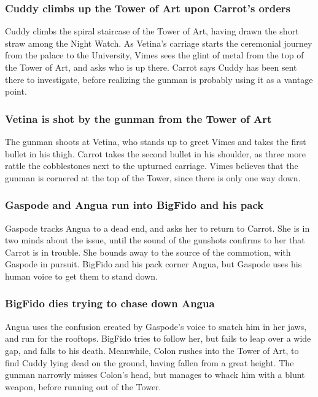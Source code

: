\subsubsection{\Gls{Cuddy} climbs up the Tower of Art upon \Gls{Carrot}'s orders}
\Gls{Cuddy} climbs the spiral staircase of the Tower of Art, having drawn the short straw among the
Night Watch. As \Gls{Vetina}'s carriage starts the ceremonial journey from the palace to the
University, \Gls{Vimes} sees the glint of metal from the top of the Tower of Art, and asks who is
up there. \Gls{Carrot} says \Gls{Cuddy} has been sent there to investigate, before realizing the
gunman is probably using it as a vantage point.

\subsubsection{\Gls{Vetina} is shot by the gunman from the Tower of Art}
The gunman shoots at \Gls{Vetina}, who stands up to greet \Gls{Vimes} and takes the first bullet in
his thigh. \Gls{Carrot} takes the second bullet in his shoulder, as three more rattle the
cobblestones next to the upturned carriage. \Gls{Vimes} believes that the gunman is cornered at the
top of the Tower, since there is only one way down.

\subsubsection{\Gls{Gaspode} and \Gls{Angua} run into \Gls{BigFido} and his pack}
\Gls{Gaspode} tracks \Gls{Angua} to a dead end, and asks her to return to \Gls{Carrot}. She is in
two minds about the issue, until the sound of the gunshots confirms to her that \Gls{Carrot} is in
trouble. She bounds away to the source of the commotion, with \Gls{Gaspode} in pursuit.
\Gls{BigFido} and his pack corner \Gls{Angua}, but \Gls{Gaspode} uses his human voice to get them
to stand down.

\subsubsection{\Gls{BigFido} dies trying to chase down \Gls{Angua}}
\Gls{Angua} uses the confusion created by \Gls{Gaspode}'s voice to snatch him in her jaws, and run
for the rooftops. \Gls{BigFido} tries to follow her, but fails to leap over a wide gap, and falls
to his death. Meanwhile, \Gls{Colon} rushes into the Tower of Art, to find \Gls{Cuddy} lying dead
on the ground, having fallen from a great height. The gunman narrowly misses \Gls{Colon}'s head,
but manages to whack him with a blunt weapon, before running out of the Tower.

